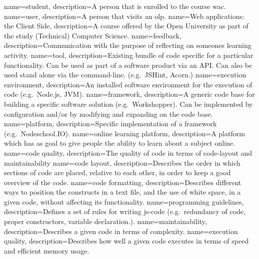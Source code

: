 {
  name=student,
  description={A person that is enrolled to the course \gls{wac}.}
}
{
  name=user,
  description={A person that visits an \gls{olp}.}
}
{
  name=Web applications: the Client Side,
  description={A course offered by the Open University
    as part of the study (Technical) Computer Science.}
}
{
  name=feedback,
  description={Communication with the purpose of
    reflecting on someones learning activity.}
}
{
  name=tool,
  description={Existing bundle of \gls{code}
    specific for a particular functionality.
    Can be used as part of a software product via an API.
    Can also be used stand alone via the command-line.
    (e.g.\ JSHint, Acorn.)}
}
{
  name=execution environment,
  description={An installed software environment
    for the execution of code (e.g.\ Node.js, JVM).}
}
{
  name=framework,
  description={A generic code base for building
    a specific software solution (e.g.\ Workshopper).
    Can be implemented by configuration and/or
    by modifying and expanding on the code base.}
}
{
  name=platform,
  description={Specific implementation of a \gls{framework}
    (e.g.\ Nodeschool.IO).}
}
{
  name=online learning platform,
  description={A \gls{platform} which has as goal
    to give people the ability to learn about a subject online.}
}
{
  name=code quality,
  description={The quality of code in terms of \gls{code-layout}
    and \gls{maintainability}}
}
{
  name=code layout,
  description={Describes the order in which sections of \gls{code} are placed,
    relative to each other,
    in order to keep a good overview of the \gls{code}.}
}
{
  name=code formatting,
  description={Describes different ways
    to position the \glspl{construct} in a text file,
    and the use of white space, in a given \gls{code},
    without affecting its functionality.}
}
{
  name=programming guidelines,
  description={Defines a set of rules for writing {js-code}
    (e.g.\ redundancy of code, proper constructors, variable declaration.).}
}
{
  name=maintainability,
  description={Describes a given \gls{code} in terms of complexity.}
}
{
  name=execution quality,
  description={Describes how well a given \gls{code} executes
    in terms of speed and efficient memory usage.}
}
